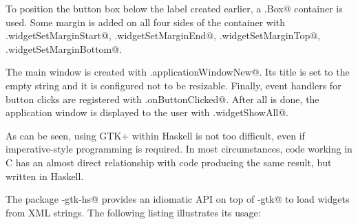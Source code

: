 \documentclass[UdineBachThesis,american,11pt,draft]{PhdThesis}
\begin{document}
  To position the button box below the label created earlier, a
  \lstinline@Gtk.Box@ container is used. Some margin is added on all four sides
  of the container with \lstinline@Gtk.widgetSetMarginStart@,
  \lstinline@Gtk.widgetSetMarginEnd@, \lstinline@Gtk.widgetSetMarginTop@,
  \lstinline@Gtk.widgetSetMarginBottom@.

  The main window is created with \lstinline@Gtk.applicationWindowNew@. Its
  title is set to the empty string and it is configured not to be resizable.
  Finally, event handlers for button clicks are registered with
  \lstinline@Gtk.onButtonClicked@. After all is done, the application window is
  displayed to the user with \lstinline@Gtk.widgetShowAll@.

  As can be seen, using GTK+ within Haskell is not too difficult, even if
  imperative-style programming is required. In most circumstances, code working
  in C has an almost direct relationship with code producing the same result,
  but written in Haskell.

  The package \lstinline@gi-gtk-hs@ provides an idiomatic API on top of
  \lstinline@gi-gtk@ to load widgets from XML strings. The following listing
  illustrates its usage:
\end{document}
